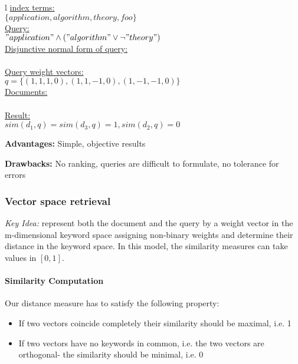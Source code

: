 \renewcommand{\arraystretch}{1.5}
\begin{tabular}{l}
\underline{index terms:} \\ $\{application, algorithm, theory, foo\}$ \\
\underline{Query:} \\ $"application" \land ("algorithm" \lor \neg "theory")$ \\
\underline{Disjunctive normal form of query:} \\ \renewcommand{\arraystretch}{1}
  \\
\underline{Query weight vectors:} \\ $q= \{(1,1,1,0),(1,1,-1,0),(1,-1,-1,0)\}$\\
\underline{Documents:} \\
 \renewcommand{\arraystretch}{1}
	 \\

\underline{Result:} \\
$sim(d_1,q)= sim(d_3,q)=1, sim(d_2,q)=0$ \\
\end{tabular}


\textbf{Advantages:} Simple, objective results

\textbf{Drawbacks:} No ranking, queries are difficult to formulate, no tolerance for errors

\subsubsection{Vector space retrieval}
\textit{Key Idea:} represent both the document and the query by a weight vector in the m-dimensional keyword space assigning non-binary weights and determine their distance in the keyword space. In this model, the similarity measures can take values in $[0,1]$.

\paragraph{Similarity Computation}
Our distance measure has to satisfy the following property: 
\begin{itemize}
\item If two vectors coincide completely their similarity should be maximal, i.e. 1
\item If two vectors have no keywords in common, i.e. the two vectors are orthogonal- the similarity should be minimal, i.e. 0
\end{itemize}

